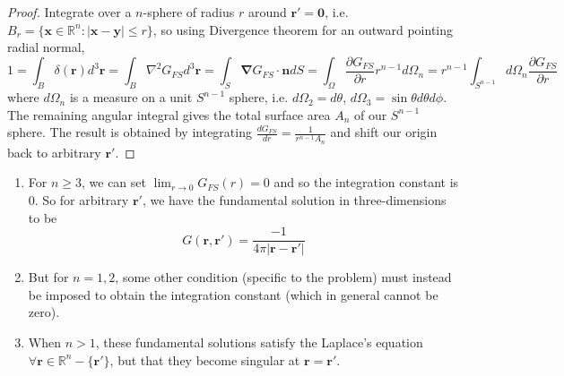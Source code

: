 \documentclass[a4paper]{article}
\begin{document}
\begin{proof}
Integrate over a $n$-sphere of radius $r$ around $\mathbf{r'}=\boldsymbol{0}$, i.e. $B_r=\{\mathbf{x}\in\mathbb{R}^n:|\mathbf{x}-\mathbf{y}|\leq r\}$, so using Divergence theorem for an outward pointing radial normal,
$$1=\int_B\delta(\mathbf{r})d^3\mathbf{r}=\int_B\nabla^2G_{FS}d^3\mathbf{r}=\int_S\boldsymbol{\nabla}G_{FS}\cdot\mathbf{n}dS=\int_\Omega\frac{\partial G_{FS}}{\partial r}r^{n-1}d\Omega_n=r^{n-1}\int_{S^{n-1}}d\Omega_n\frac{\partial G_{FS}}{\partial r}$$
where $d\Omega_n$ is a measure on a unit $S^{n-1}$ sphere, i.e. $d\Omega_2=d\theta$, $d\Omega_3=\sin\theta d\theta d\phi$. The remaining angular integral gives the total surface area $A_n$ of our $S^{n-1}$ sphere. The result is obtained by integrating $\frac{dG_{FS}}{dr}=\frac{1}{r^{n-1}A_n}$ and shift our origin back to arbitrary $\mathbf{r'}$.
\end{proof}
\begin{remarks}\leavevmode
\begin{enumerate}
    \item For $n\geq3$, we can set $\lim_{r\rightarrow0}G_{FS}(r)=0$ and so the integration constant is 0. So for arbitrary $\mathbf{r'}$, we have the fundamental solution in three-dimensions to be
\begin{equation}
    G(\mathbf{r},\mathbf{r'})=\frac{-1}{4\pi|\mathbf{r}-\mathbf{r'}|}\tag{10.14}
\end{equation}
\item But for $n=1,2$, some other condition (specific to the problem) must instead be imposed to obtain the integration constant (which in general cannot be zero).
\item When $n>1$, these fundamental solutions satisfy the Laplace's equation $\forall\mathbf{r}\in\mathbb{R}^n-\{\mathbf{r'}\}$, but that they become singular at $\mathbf{r}=\mathbf{r'}$.
\end{enumerate}
\end{remarks}
\end{document}
